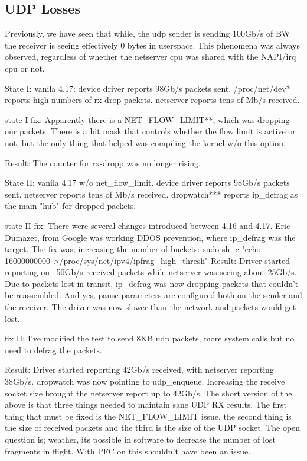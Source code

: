 \subsection{UDP Losses}
Previously, we have seen that while, the udp sender is sending 100Gb/s of BW the receiver is seeing effectively 0 bytes in userspace. This phenomena was always observed, regardless of whether the netserver cpu was shared with the NAPI/irq cpu or not.

State I:  vanila 4.17: 
device driver reports 98Gb/s packets sent.
/proc/net/dev* reports high numbers of rx-drop packets.
netserver reports tens of Mb/s received. 

state I fix: Apparently  there is  a NET\_FLOW\_LIMIT**, which was dropping our packets.
There is a bit mask that controls whether the flow limit is active or not, but the only thing that helped was compiling the kernel w/o this option.

Result: The counter for rx-dropp was no longer rising. 

State II: vanila 4.17 w/o net\_flow\_limit.
device driver reports 98Gb/s packets sent.
netserver reports tens of Mb/s received.
dropwatch*** reports ip\_defrag as the main "hub" for dropped packets.

state II fix: There were several changes introduced between 4.16 and 4.17. Eric Dumazet, from Google was working DDOS prevention, where ip\_defrag was the target.
The fix was; increasing the number of buckets:
sudo sh -c "echo 16000000000 >/proc/sys/net/ipv4/ipfrag\_high\_thresh"
Result: 
Driver started reporting on ~50Gb/s received packets while netserver was seeing about 25Gb/s. Due to packets lost in transit, ip\_defrag was now dropping packets that couldn't be reassembled. And yes, pause parameters are configured both on the sender and the receiver. The driver was now slower than the network and packets would get lost. 

fix II: I've modified the test to send 8KB udp packets, more system calls but no need to defrag the packets.

Result: Driver started reporting 42Gb/s received, with netserver reporting 38Gb/s.
dropwatch was now pointing to udp\_enqueue. Increasing the receive socket size
brought the netserver report up to 42Gb/s.
The short version of the above is that three things needed to maintain sane UDP RX results. The first thing that must be fixed is the NET\_FLOW\_LIMIT issue, the second thing is the size of received packets and the third is the size of the UDP socket.
The open question is; weather, its possible in software to decrease the number of lost fragments in flight. With PFC on this shouldn't have been an issue.
